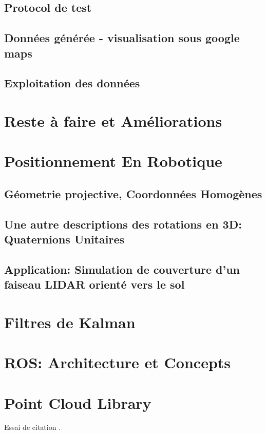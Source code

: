 \documentclass[12pt,a4paper]{report}
\begin{document}
	\section{Protocol de test}
	
	\section{Données générée - visualisation sous google maps}
	
	\section{Exploitation des données}

\chapter{Reste à faire et Améliorations}


\begin{appendix}
	\chapter{Positionnement En Robotique}
		\section{Géometrie projective, Coordonnées Homogènes}
		\section{Une autre descriptions des rotations en 3D: Quaternions Unitaires}
		\section{Application: Simulation de couverture d'un faiseau LIDAR orienté vers le sol}
	
	\chapter{Filtres de Kalman}
	
	\chapter{ROS: Architecture et Concepts}
	
	\chapter{Point Cloud Library}
	Essai de citation \cite{kaplan_understanding_2006}.

\end{appendix}

\nocite{*}


\end{document}
